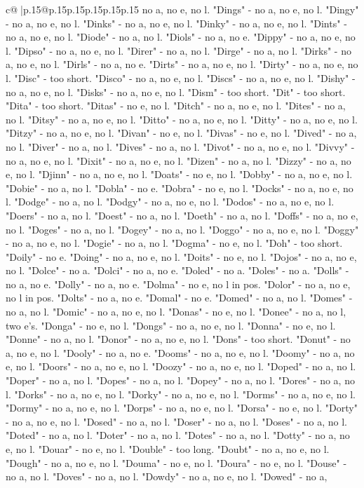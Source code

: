 \documentclass{article}
\begin{document}
{\begin{supertabular}{c@{$\;$}|p{.15\linewidth}@{}p{.15\linewidth}p{.15\linewidth}p{.15\linewidth}p{.15\linewidth}p{.15\linewidth}}
{{{no a, no e, no l. "Dings" {-} no a, no e, no l. "Dingy" {-} no a, no e, no l. "Dinks" {-} no a, no e, no l. "Dinky" {-} no a, no e, no l. "Dints" {-} no a, no e, no l. "Diode" {-} no a, no l. "Diols" {-} no a, no e. "Dippy" {-} no a, no e, no l. "Dipso" {-} no a, no e, no l. "Direr" {-} no a, no l. "Dirge" {-} no a, no l. "Dirks" {-} no a, no e, no l. "Dirls" {-} no a, no e. "Dirts" {-} no a, no e, no l. "Dirty" {-} no a, no e, no l. "Disc" {-} too short. "Disco" {-} no a, no e, no l. "Discs" {-} no a, no e, no l. "Dishy" {-} no a, no e, no l. "Disks" {-} no a, no e, no l. "Dism" {-} too short. "Dit" {-} too short. "Dita" {-} too short. "Ditas" {-} no e, no l. "Ditch" {-} no a, no e, no l. "Dites" {-} no a, no l. "Ditsy" {-} no a, no e, no l. "Ditto" {-} no a, no e, no l. "Ditty" {-} no a, no e, no l. "Ditzy" {-} no a, no e, no l. "Divan" {-} no e, no l. "Divas" {-} no e, no l. "Dived" {-} no a, no l. "Diver" {-} no a, no l. "Dives" {-} no a, no l. "Divot" {-} no a, no e, no l. "Divvy" {-} no a, no e, no l. "Dixit" {-} no a, no e, no l. "Dizen" {-} no a, no l. "Dizzy" {-} no a, no e, no l. "Djinn" {-} no a, no e, no l. "Doats" {-} no e, no l. "Dobby" {-} no a, no e, no l. "Dobie" {-} no a, no l. "Dobla" {-} no e. "Dobra" {-} no e, no l. "Docks" {-} no a, no e, no l. "Dodge" {-} no a, no l. "Dodgy" {-} no a, no e, no l. "Dodos" {-} no a, no e, no l. "Doers" {-} no a, no l. "Doest" {-} no a, no l. "Doeth" {-} no a, no l. "Doffs" {-} no a, no e, no l. "Doges" {-} no a, no l. "Dogey" {-} no a, no l. "Doggo" {-} no a, no e, no l. "Doggy" {-} no a, no e, no l. "Dogie" {-} no a, no l. "Dogma" {-} no e, no l. "Doh" {-} too short. "Doily" {-} no e. "Doing" {-} no a, no e, no l. "Doits" {-} no e, no l. "Dojos" {-} no a, no e, no l. "Dolce" {-} no a. "Dolci" {-} no a, no e. "Doled" {-} no a. "Doles" {-} no a. "Dolls" {-} no a, no e. "Dolly" {-} no a, no e. "Dolma" {-} no e, no l in pos. "Dolor" {-} no a, no e, no l in pos. "Dolts" {-} no a, no e. "Domal" {-} no e. "Domed" {-} no a, no l. "Domes" {-} no a, no l. "Domic" {-} no a, no e, no l. "Donas" {-} no e, no l. "Donee" {-} no a, no l, two e's. "Donga" {-} no e, no l. "Dongs" {-} no a, no e, no l. "Donna" {-} no e, no l. "Donne" {-} no a, no l. "Donor" {-} no a, no e, no l. "Dons" {-} too short. "Donut" {-} no a, no e, no l. "Dooly" {-} no a, no e. "Dooms" {-} no a, no e, no l. "Doomy" {-} no a, no e, no l. "Doors" {-} no a, no e, no l. "Doozy" {-} no a, no e, no l. "Doped" {-} no a, no l. "Doper" {-} no a, no l. "Dopes" {-} no a, no l. "Dopey" {-} no a, no l. "Dores" {-} no a, no l. "Dorks" {-} no a, no e, no l. "Dorky" {-} no a, no e, no l. "Dorms" {-} no a, no e, no l. "Dormy" {-} no a, no e, no l. "Dorps" {-} no a, no e, no l. "Dorsa" {-} no e, no l. "Dorty" {-} no a, no e, no l. "Dosed" {-} no a, no l. "Doser" {-} no a, no l. "Doses" {-} no a, no l. "Doted" {-} no a, no l. "Doter" {-} no a, no l. "Dotes" {-} no a, no l. "Dotty" {-} no a, no e, no l. "Douar" {-} no e, no l. "Double" {-} too long. "Doubt" {-} no a, no e, no l. "Dough" {-} no a, no e, no l. "Douma" {-} no e, no l. "Doura" {-} no e, no l. "Douse" {-} no a, no l. "Doves" {-} no a, no l. "Dowdy" {-} no a, no e, no l. "Dowed" {-} no a, }}}
\end{supertabular}}
\end{document}
